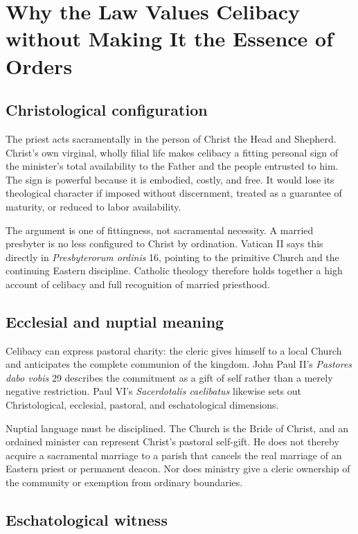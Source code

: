 \section{Why the Law Values Celibacy without Making It the Essence of Orders}

\subsection{Christological configuration}

The priest acts sacramentally in the person of Christ the Head and Shepherd. Christ's own virginal, wholly filial life makes celibacy a fitting personal sign of the minister's total availability to the Father and the people entrusted to him. The sign is powerful because it is embodied, costly, and free. It would lose its theological character if imposed without discernment, treated as a guarantee of maturity, or reduced to labor availability.

The argument is one of fittingness, not sacramental necessity. A married presbyter is no less configured to Christ by ordination. Vatican II says this directly in \emph{Presbyterorum ordinis} 16, pointing to the primitive Church and the continuing Eastern discipline. Catholic theology therefore holds together a high account of celibacy and full recognition of married priesthood.

\subsection{Ecclesial and nuptial meaning}

Celibacy can express pastoral charity: the cleric gives himself to a local Church and anticipates the complete communion of the kingdom. John Paul II's \emph{Pastores dabo vobis} 29 describes the commitment as a gift of self rather than a merely negative restriction. Paul VI's \emph{Sacerdotalis caelibatus} likewise sets out Christological, ecclesial, pastoral, and eschatological dimensions.

Nuptial language must be disciplined. The Church is the Bride of Christ, and an ordained minister can represent Christ's pastoral self-gift. He does not thereby acquire a sacramental marriage to a parish that cancels the real marriage of an Eastern priest or permanent deacon. Nor does ministry give a cleric ownership of the community or exemption from ordinary boundaries.

\subsection{Eschatological witness}

